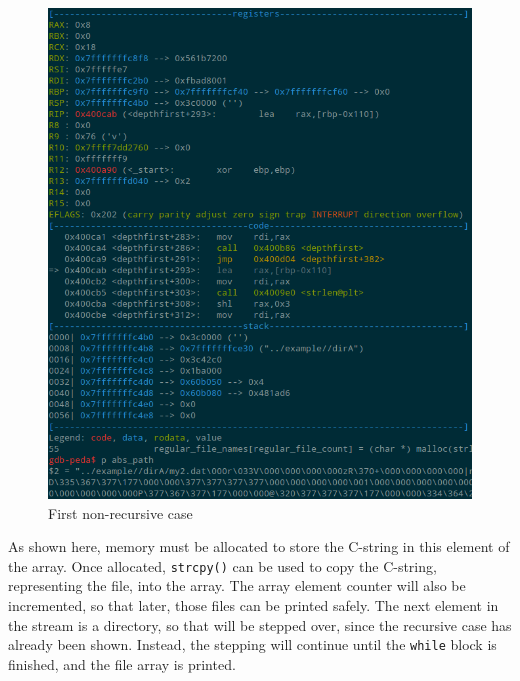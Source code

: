 \documentclass[a4paper,12pt,sffamily]{article}
\begin{document}
\begin{figure}[H]
	\centering
	\includegraphics[width=1\linewidth]{./images/10}
	\caption[first_non_recursive_case]{First non-recursive case}
	\label{fig:10}
\end{figure}
As shown here, memory must be allocated to store the C-string in this element of the array. Once
allocated, \texttt{strcpy()} can be used to copy the C-string, representing the file, into the
array. The array element counter will also be incremented, so that later, those files can be printed
safely.
The next element in the stream is a directory, so that will be stepped over, since the recursive case 
has already been shown. Instead, the stepping will continue until the \texttt{while} block is 
finished, and the file array is printed.
\end{document}

